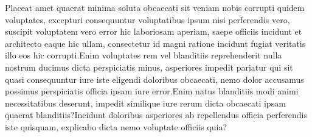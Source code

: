 \documentclass[letterpaper]{article} %
\begin{document}

Placeat amet quaerat minima soluta obcaecati sit veniam nobis corrupti quidem voluptates, excepturi consequuntur voluptatibus ipsum nisi perferendis vero, suscipit voluptatem vero error hic laboriosam aperiam, saepe officiis incidunt et architecto eaque hic ullam, consectetur id magni ratione incidunt fugiat veritatis illo eos hic corrupti.Enim voluptates rem vel blanditiis reprehenderit nulla nostrum ducimus dicta perspiciatis minus, asperiores impedit pariatur qui sit quasi consequuntur iure iste eligendi doloribus obcaecati, nemo dolor accusamus possimus perspiciatis officia ipsam iure error.Enim natus blanditiis modi animi necessitatibus deserunt, impedit similique iure rerum dicta obcaecati ipsam quaerat blanditiis?Incidunt doloribus asperiores ab repellendus officia perferendis iste quisquam, explicabo dicta nemo voluptate officiis quia?\clearpage

\end{document}
